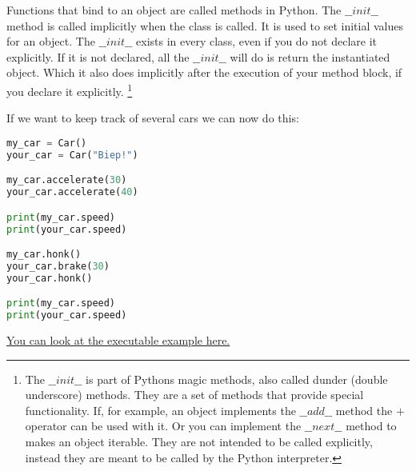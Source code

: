 \documentclass{article}
\begin{document}
Functions that bind to an object are called methods in Python.
The $\_\_init\_\_$ method is called implicitly when the class is called.
It is used to set initial values for an object.
The $\_\_init\_\_$ exists in every class, even if you do not declare it explicitly.
If it is not declared, all the $\_\_init\_\_$ will do is return the instantiated object.
Which it also does implicitly after the execution of your method block,
if you declare it explicitly.
\footnote{The $\_\_init\_\_$ is part of Pythons magic methods,
    also called dunder (double underscore) methods.
    They are a set of methods that provide special functionality.
    If, for example, an object implements the $\_\_add\_\_$ method the $+$ operator
    can be used with it.
    Or you can implement the $\_\_next\_\_$ method to makes an object iterable.
    They are not intended to be called explicitly, instead they are meant to be
    called by the Python interpreter.}

If we want to keep track of several cars we can now do this:

\begin{lstlisting}[language=python]
my_car = Car()
your_car = Car("Biep!")

my_car.accelerate(30)
your_car.accelerate(40)

print(my_car.speed)
print(your_car.speed)

my_car.honk()
your_car.brake(30)
your_car.honk()

print(my_car.speed)
print(your_car.speed)
\end{lstlisting}

\href{http://pythontutor.com/visualize.html#code=class%20Car%28%29%3A%0A%0A%20%20%20%20horn_sound%3A%20str%20%3D%20%22Honk!%22%0A%20%20%20%20_speed%3A%20float%20%3D%200.0%0A%0A%20%20%20%20def%20__init__%28self,%20horn_sound%3A%20str%20%3D%20None%29%3A%0A%20%20%20%20%20%20%20%20if%20horn_sound%3A%0A%20%20%20%20%20%20%20%20%20%20%20%20self.horn_sound%20%3D%20horn_sound%0A%0A%20%20%20%20def%20accelerate%28self,%20kmh%3A%20float%20%3D%200.0%29%3A%0A%20%20%20%20%20%20%20%20self._speed%20%3D%20self._speed%20%2B%20kmh%0A%0A%20%20%20%20def%20brake%28self,%20target_kmh%3A%20float%20%3D%200.0%29%3A%0A%20%20%20%20%20%20%20%20if%20target_kmh%20%3C%20self._speed%3A%0A%20%20%20%20%20%20%20%20%20%20%20%20self._speed%20%3D%20float%28target_kmh%29%0A%0A%20%20%20%20def%20honk%28self%29%3A%0A%20%20%20%20%20%20%20%20print%28self.horn_sound%29%0A%0A%20%20%20%20%40property%0A%20%20%20%20def%20speed%28self%29%3A%0A%20%20%20%20%20%20%20%20return%20f%22%7Bself._speed%7D%20km/h%22%0A%20%20%20%20%20%20%20%20%0Amy_car%20%3D%20Car%28%29%0Ayour_car%20%3D%20Car%28%22Biep!%22%29%0A%0Amy_car.accelerate%2830%29%0Ayour_car.accelerate%2840%29%0A%0Aprint%28my_car.speed%29%0Aprint%28your_car.speed%29%0A%0Amy_car.honk%28%29%0Ayour_car.brake%2830%29%0Ayour_car.honk%28%29%0A%0Aprint%28my_car.speed%29%0Aprint%28your_car.speed%29%0A&cumulative=false&curInstr=47&heapPrimitives=nevernest&mode=display&origin=opt-frontend.js&py=3&rawInputLstJSON=%5B%5D&textReferences=false}{You can look at the executable example here.}
\end{document}
